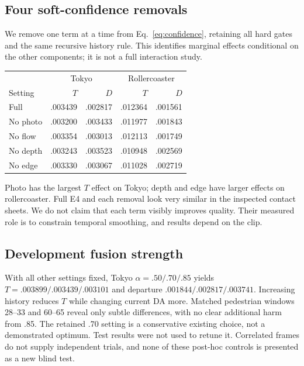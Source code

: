 \documentclass[10pt,twocolumn,letterpaper]{article}
\begin{document}
\subsection{Four soft-confidence removals}
We remove one term at a time from Eq.~\ref{eq:confidence}, retaining all hard gates and the same recursive history rule. This identifies marginal effects conditional on the other components; it is not a full interaction study.

\begin{center}\begin{minipage}{\linewidth}\centering
{}
\small
\begin{tabular}{lrrrr}
\toprule
&\multicolumn{2}{c}{Tokyo}&\multicolumn{2}{c}{Rollercoaster}\\
Setting &$T$&$D$&$T$&$D$\\
\midrule
Full&.003439&.002817&.012364&.001561\\
No photo&.003200&.003433&.011977&.001843\\
No flow&.003354&.003013&.012113&.001749\\
No depth&.003243&.003523&.010948&.002569\\
No edge&.003330&.003067&.011028&.002719\\
\bottomrule
\end{tabular}
\end{minipage}\end{center}

Photo has the largest $T$ effect on Tokyo; depth and edge have larger effects on rollercoaster. Full E4 and each removal look very similar in the inspected contact sheets. We do not claim that each term visibly improves quality. Their measured role is to constrain temporal smoothing, and results depend on the clip.

\subsection{Development fusion strength}
With all other settings fixed, Tokyo $\alpha=.50/.70/.85$ yields $T=.003899/.003439/.003101$ and departure $.001844/.002817/.003741$. Increasing history reduces $T$ while changing current DA more. Matched pedestrian windows 28--33 and 60--65 reveal only subtle differences, with no clear additional harm from .85. The retained .70 setting is a conservative existing choice, not a demonstrated optimum. Test results were not used to retune it. Correlated frames do not supply independent trials, and none of these post-hoc controls is presented as a new blind test.
\end{document}
